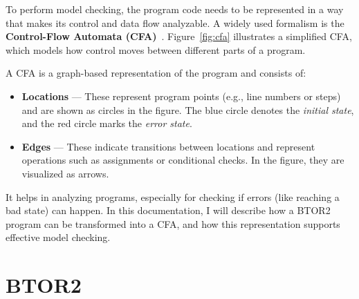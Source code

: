 
To perform model checking, the program code needs to be represented in a way that makes its control and data flow analyzable. A widely used formalism is the \textbf{Control-Flow Automata (CFA)}~\cite{cfa}. Figure~\ref{fig:cfa} illustrates a simplified CFA, which models how control moves between different parts of a program.

A CFA is a graph-based  representation of the program and consists of:
\begin{itemize}
  \item \textbf{Locations} — These represent program points (e.g., line numbers or steps) and are shown as circles in the figure. The blue circle denotes the \textit{initial state}, and the red circle marks the \textit{error state}.
  \item \textbf{Edges} — These indicate transitions between locations and represent operations such as assignments or conditional checks. In the figure, they are visualized as arrows.
\end{itemize}

It helps in analyzing programs, especially for checking if errors (like reaching a bad state) can happen. In this documentation, I will describe how a BTOR2 program can be transformed into a CFA, and how this representation supports effective model checking.

\section{ BTOR2 }

